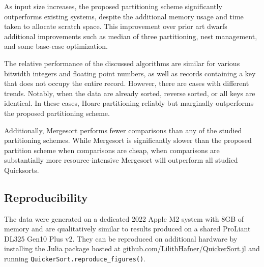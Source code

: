 \documentclass{juliacon}
\begin{document}
As input size increases, the proposed partitioning scheme significantly outperforms existing systems, despite the additional memory usage and time taken to allocate scratch space. This improvement over prior art dwarfs additional improvements such as median of three partitioning, nest management, and some base-case optimization.

The relative performance of the discussed algorithms are similar for various bitwidth integers and floating point numbers, as well as records containing a key that does not occupy the entire record. However, there are cases with different trends. Notably, when the data are already sorted, reverse sorted, or all keys are identical. In these cases, Hoare partitioning reliably but marginally outperforms the proposed partitioning scheme.

\vspace{8pt}


\vspace{5pt}

Additionally, Mergesort performs fewer comparisons than any of the studied partitioning schemes. While Mergesort is significantly slower than the proposed partition scheme when comparisons are cheap, when comparisons are substantially more resource-intensive Mergesort will outperform all studied Quicksorts.

\subsection{Reproducibility}

The data were generated on a dedicated 2022 Apple M2 system with 8GB of memory and are qualitatively similar to results produced on a shared ProLiant DL325 Gen10 Plus v2. They can be reproduced on additional hardware by installing the Julia package hosted at \href{https://github.com/LilithHafner/QuickerSort.jl}{github.com/LilithHafner/QuickerSort.jl} and running \lstinline{QuickerSort.reproduce_figures()}.
\end{document}
